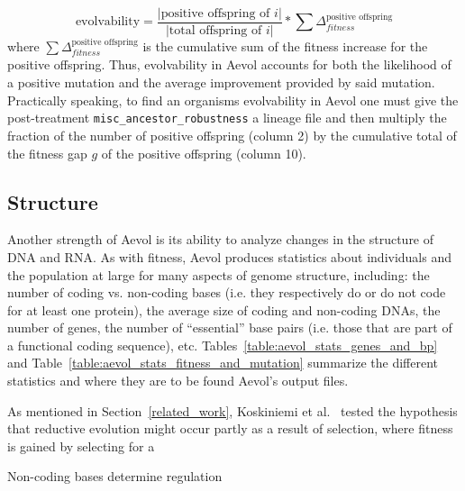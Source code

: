 \begin{equation*}
\text{evolvability} = \frac{|\text{positive offspring of }i|}{|\text{total offspring of }i|}*\sum \Delta^{\text{positive offspring}}_{fitness}
\end{equation*}  where $\sum \Delta^{\text{positive offspring}}_{fitness}$ is the cumulative sum of the fitness increase for the positive offspring. Thus, evolvability in Aevol accounts for both the likelihood of a positive mutation and the average improvement provided by said mutation. Practically speaking, to find an organisms evolvability in Aevol one must give the post-treatment \texttt{misc\_ancestor\_robustness} a lineage file and then multiply the fraction of the number of positive offspring (column 2) by the cumulative total of the fitness gap $g$ of the positive offspring (column 10).


 
\subsection{Structure}\label{methods:structure}
Another strength of Aevol is its ability to analyze changes in the structure of DNA and RNA. As with fitness, Aevol produces statistics about individuals and the population at large for many aspects of genome structure, including: the number of coding vs. non-coding bases (i.e. they respectively do or do not code for at least one protein), the average size of coding and non-coding DNAs, the number of genes, the number of ``essential'' base pairs (i.e. those that are part of a functional coding sequence), etc. Tables~\ref{table:aevol_stats_genes_and_bp} and Table~\ref{table:aevol_stats_fitness_and_mutation} summarize the different statistics and where they are to be found Aevol's output files. 

As mentioned in Section~\ref{related_work}, Koskiniemi et al.~\cite{koskiniemi2012} tested the hypothesis that reductive evolution might occur partly as a result of selection, where fitness is gained by selecting for a 

Non-coding bases determine regulation %
	

